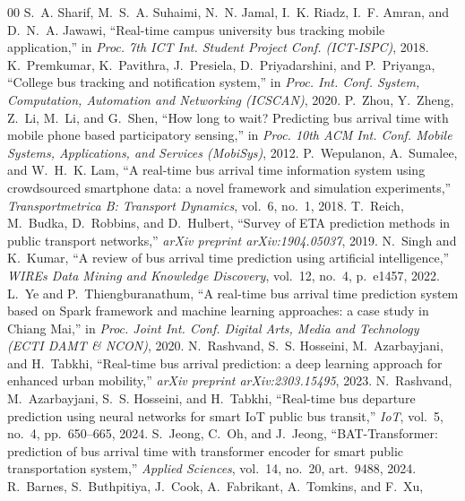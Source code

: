 \documentclass[conference]{IEEEtran}
\begin{document}
\begin{thebibliography}{00}
S.~A. Sharif, M.~S.~A. Suhaimi, N.~N. Jamal, I.~K. Riadz, I.~F. Amran, and
D.~N.~A. Jawawi, ``Real-time campus university bus tracking mobile
application,'' in \textit{Proc. 7th ICT Int. Student Project Conf.
(ICT-ISPC)}, 2018.
K.~Premkumar, K.~Pavithra, J.~Presiela, D.~Priyadarshini, and P.~Priyanga,
``College bus tracking and notification system,'' in \textit{Proc. Int. Conf.
System, Computation, Automation and Networking (ICSCAN)}, 2020.
P.~Zhou, Y.~Zheng, Z.~Li, M.~Li, and G.~Shen, ``How long to wait? Predicting
bus arrival time with mobile phone based participatory sensing,'' in
\textit{Proc. 10th ACM Int. Conf. Mobile Systems, Applications, and Services
(MobiSys)}, 2012.
P.~Wepulanon, A.~Sumalee, and W.~H.~K. Lam, ``A real-time bus arrival time
information system using crowdsourced smartphone data: a novel framework and
simulation experiments,'' \textit{Transportmetrica B: Transport Dynamics},
vol.~6, no.~1, 2018.
T.~Reich, M.~Budka, D.~Robbins, and D.~Hulbert, ``Survey of ETA prediction
methods in public transport networks,'' \textit{arXiv preprint
arXiv:1904.05037}, 2019.
N.~Singh and K.~Kumar, ``A review of bus arrival time prediction using
artificial intelligence,'' \textit{WIREs Data Mining and Knowledge Discovery},
vol.~12, no.~4, p.~e1457, 2022.
L.~Ye and P.~Thiengburanathum, ``A real-time bus arrival time prediction
system based on Spark framework and machine learning approaches: a case study
in Chiang Mai,'' in \textit{Proc. Joint Int. Conf. Digital Arts, Media and
Technology (ECTI DAMT \& NCON)}, 2020.
N.~Rashvand, S.~S. Hosseini, M.~Azarbayjani, and H.~Tabkhi, ``Real-time bus
arrival prediction: a deep learning approach for enhanced urban mobility,''
\textit{arXiv preprint arXiv:2303.15495}, 2023.
N.~Rashvand, M.~Azarbayjani, S.~S. Hosseini, and H.~Tabkhi, ``Real-time bus
departure prediction using neural networks for smart IoT public bus
transit,'' \textit{IoT}, vol.~5, no.~4, pp.~650--665, 2024.
S.~Jeong, C.~Oh, and J.~Jeong, ``BAT-Transformer: prediction of bus arrival
time with transformer encoder for smart public transportation system,''
\textit{Applied Sciences}, vol.~14, no.~20, art.~9488, 2024.
R.~Barnes, S.~Buthpitiya, J.~Cook, A.~Fabrikant, A.~Tomkins, and F.~Xu,

\end{thebibliography}
\end{document}
